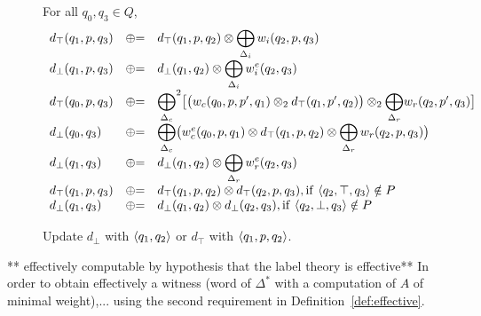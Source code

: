 \begin{figure}
For all $q_0, q_3 \in Q$, %
\[
\begin{array}{lcl}
d_\top(q_1, p, q_3) & \opluseq &
  d_\top(q_1, p, q_2) \otimes
  \displaystyle\bigoplus_{\Deltai} \weii(q_2, p, q_3)\\
%
d_\bot(q_1, p, q_3) & \opluseq &
  d_\bot(q_1, q_2) \otimes
  \displaystyle\bigoplus_{\Deltai} \weiei(q_2, q_3)\\
%
d_\top(q_0, p, q_3) & \opluseq &
  {\displaystyle\bigoplus_{\Deltac}}^2
  \bigl[ \bigl( \weic(q_0, p, p', q_1) \otimes_2
  d_\top(q_1, p', q_2) \bigr) \otimes_2
  {\displaystyle\bigoplus_{\Deltar}} \weir(q_2, p', q_3) \bigr]\\
%
d_\bot(q_0, q_3) & \opluseq &
  {\displaystyle\bigoplus_{\Deltac}}
  \bigl(
  \weiec(q_0, p, q_1) \otimes
   d_\top(q_1, p, q_2) \otimes
  \displaystyle\bigoplus_{\Deltar} \weir(q_2, p, q_3)\bigr)\\
%
d_\bot(q_1, q_3) & \opluseq &
  d_\bot(q_1, q_2) \otimes
  \displaystyle\bigoplus_{\Deltar} \weier(q_2, q_3)\\
%
d_\top(q_1, p, q_3) & \opluseq &
  d_\top(q_1, p, q_2) \otimes d_\top(q_2, p, q_3),
  \mathrm{if~} \< q_2, \top, q_3> \notin P \\
%
d_\bot(q_1, q_3) & \opluseq &
  d_\bot(q_1, q_2) \otimes d_\bot(q_2, q_3), \mathrm{if~} \< q_2, \bot, q_3> \notin P \\
\end{array}
\]
%
\caption{Update $d_\bot$ with $\<q_1, q_2>$ or $d_\top$ with $\< q_1, p, q_2>$.}
\label{fig:best-update}
\end{figure}


\noindent
** effectively computable by hypothesis that the label theory is effective**
In order to obtain effectively a witness
(word of $\Delta^*$ with a computation of $A$ of minimal weight),...
using the second requirement in Definition~\ref{def:effective}.




